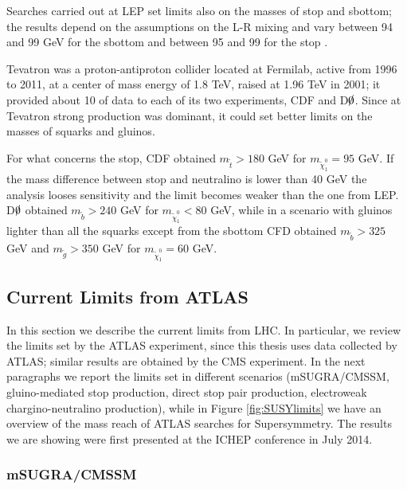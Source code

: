 Searches carried out at LEP set limits also on the masses of stop and sbottom; the results depend on the assumptions on the L-R mixing and vary between 94 and 99 GeV for the sbottom and between 95 and 99 for the stop \cite{LEPWG:3rdgen}.

Tevatron was a proton-antiproton collider located at Fermilab, active from 1996 to 2011, at a center of mass energy of 1.8 TeV, raised at 1.96 TeV in 2001; it provided about 10 \ifb of data to each of its two experiments, CDF and D$\slashed{0}$. Since at Tevatron strong production was dominant, it could set better limits on the masses of squarks and gluinos.
 
For what concerns the stop, CDF obtained $m_{\tilde{t}} > 180$ GeV for $m_{\tilde{\chi}_1^0} = 95$ GeV. If the mass difference between stop and neutralino is lower than 40 GeV the analysis looses sensitivity and the limit becomes weaker than the one from LEP. D$\slashed{0}$ obtained  $m_{\tilde{b}} > 240$ GeV for $m_{\tilde{\chi}_1^0} < 80$ GeV, while in a scenario with gluinos lighter than all the squarks except from the sbottom CFD obtained $m_{\tilde{b}} > 325$ GeV and $m_{\tilde{g}} > 350$ GeV for $m_{\tilde{\chi}_1^0} = 60$ GeV.




\subsection{Current Limits from ATLAS}
\label{sec:ATLASlimits}

In this section we describe the current limits from LHC. In particular, we review the limits set by the ATLAS experiment, since this thesis uses data collected by ATLAS; similar results are obtained by the CMS experiment. In the next paragraphs we report the limits set in different scenarios (mSUGRA/CMSSM, gluino-mediated stop production, direct stop pair production, electroweak chargino-neutralino production), while in Figure \ref{fig:SUSYlimits} we have an overview of the mass reach of ATLAS searches for Supersymmetry. The results we are showing were first presented at the ICHEP conference in July 2014.


\subsubsection{mSUGRA/CMSSM}

